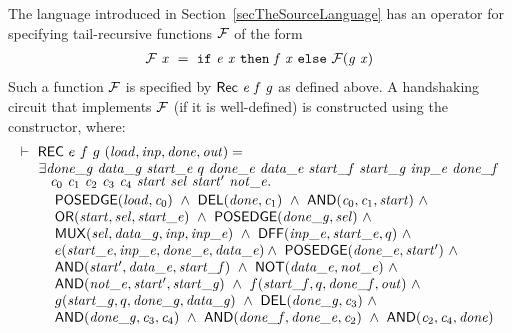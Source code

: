 \documentclass{llncs}
\begin{document}
The language introduced in Section~\ref{secTheSourceLanguage} 
has an operator  for specifying tail-recursive functions ${\cal{F}}$
of the form
\[
\begin{array}{l}
\mathit{{\cal{F}}}\ \mathit{x} ~=~ \texttt{if}~\mathit{e}\ \mathit{x}~\texttt{then}~\mathit{f}\ \mathit{x}~\texttt{else}~\mathit{{\cal{F}}}(\mathit{g}\  \mathit{x})
\end{array}
\]
Such a function ${\cal{F}}$ is specified by $\mathsf{Rec}~\mathit{e}~\mathit{f}~\mathit{g}$ as defined
above. A handshaking circuit that implements ${\cal{F}}$ (if it is well-defined) is
constructed using the  constructor, where:
\[
\begin{array}{l}
\TURNST\ \DEF{REC}\ e\ f\ g\ (\VAR{load,inp,done,out}) = \\
\phantom{\TURNST\ ~}
     \exists \VAR{done\_g}~ \VAR{data\_g}~ \VAR{start\_e}~ q~ \VAR{done\_e}~ 
             \VAR{data\_e}~ \VAR{start\_f}~ \VAR{start\_g}~ \VAR{inp\_e}~ 
             \VAR{done\_f}\\[-1mm]
\phantom{\TURNST\ ~\exists }
             \sVAR{c}{0}~ \sVAR{c}{1}~ 
             \sVAR{c}{2}~ \sVAR{c}{3}~\sVAR{c}{4}~
             \VAR{start}~ \VAR{sel}~ \VAR{start'}~ \VAR{not\_e}. \\[0.5mm]
\phantom{\TURNST\ ~\exists~ }
        \DEF{POSEDGE}(\VAR{load},\sVAR{c}{0})\ \AND\
        \DEF{DEL}(\VAR{done},\sVAR{c}{1})\ \AND\
        \DEF{AND}(\sVAR{c}{0},\sVAR{c}{1},\VAR{start})\ \AND \\
\phantom{\TURNST\ ~\exists~ }
        \DEF{OR}(\VAR{start,sel,start\_e})\ \AND\
        \DEF{POSEDGE}(\VAR{done\_g,sel})\ \AND \\
\phantom{\TURNST\ ~\exists~ }
        \DEF{MUX}(\VAR{sel,data\_g,inp,inp\_e})\ \AND\
           \DEF{DFF}(\VAR{inp\_e},\VAR{start\_e},q)\ \AND \\
\phantom{\TURNST\ ~\exists~ }
           e (\VAR{start\_e},\VAR{inp\_e},\VAR{done\_e},\VAR{data\_e}) \AND\
        \DEF{POSEDGE}(\VAR{done\_e,start'})\ \AND \\
\phantom{\TURNST\ ~\exists~ }
        \DEF{AND}(\VAR{start',data\_e,start\_f})\ \AND\
        \DEF{NOT}(\VAR{data\_e,not\_e})\ \AND \\
\phantom{\TURNST\ ~\exists~ }
        \DEF{AND}(\VAR{not\_e,start',start\_g})\ \AND\
           f (\VAR{start\_f},q,\VAR{done\_f},\VAR{out})\ \AND\\
\phantom{\TURNST\ ~\exists~ }
           g (\VAR{start\_g},q,\VAR{done\_g},\VAR{data\_g})\ \AND\
        \DEF{DEL}(\VAR{done\_g},\sVAR{c}{3})\ \AND\\
\phantom{\TURNST\ ~\exists~ }
        \DEF{AND}(\VAR{done\_g},\sVAR{c}{3},\sVAR{c}{4})\ \AND\
        \DEF{AND}(\VAR{done\_f},\VAR{done\_e},\sVAR{c}{2})\ \AND\
        \DEF{AND}(\sVAR{c}{2},\sVAR{c}{4},\VAR{done})
\end{array}
\]
\end{document}
